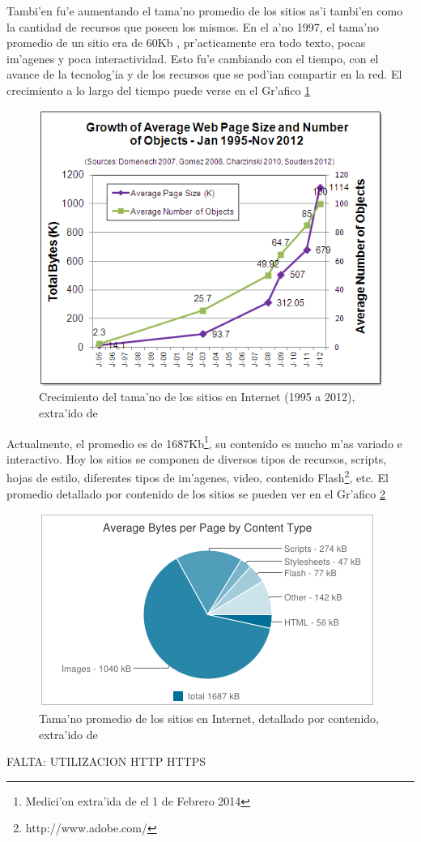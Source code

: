 Tambi'en fu'e aumentando el tama'no promedio de los sitios as'i tambi'en como la cantidad de recursos que poseen los mismos. En el a'no 1997, el tama'no promedio de un sitio era de 60Kb \citep{atw}, pr'acticamente era todo texto, pocas im'agenes y poca interactividad. Esto fu'e cambiando con el tiempo, con el avance de la tecnolog'ia y de los recursos que se pod'ian compartir en la red. El crecimiento a lo largo del tiempo puede verse en el Gr'afico \ref{grafCrecSitios}

\begin{figure}[h]
  	\centering
	\includegraphics[width=\textwidth]{img/grafCrecSitios}
	\caption{\small Crecimiento del tama'no de los sitios en Internet (1995 a 2012), extra'ido de \cite{tamanoSitios}}
	\label{grafCrecSitios}
\end{figure}

Actualmente, el promedio es de 1687Kb\footnote{Medici'on extra'ida de \citep{httparchive} el 1 de Febrero 2014}, su contenido es mucho m'as variado e interactivo. Hoy los sitios se componen de diversos tipos de recursos, scripts, hojas de estilo, diferentes tipos de im'agenes, video, contenido Flash\footnote{http://www.adobe.com/}, etc. El promedio detallado por contenido de los sitios se pueden ver en el Gr'afico \ref{grafSitiosFeb2014}

\begin{figure}[h]
  	\centering
	\includegraphics[width=\textwidth]{img/grafSitiosFeb2014}
	\caption{\small Tama'no promedio de los sitios en Internet, detallado por contenido, extra'ido de \cite{httparchive}}
	\label{grafSitiosFeb2014}
\end{figure}


FALTA: UTILIZACION HTTP HTTPS